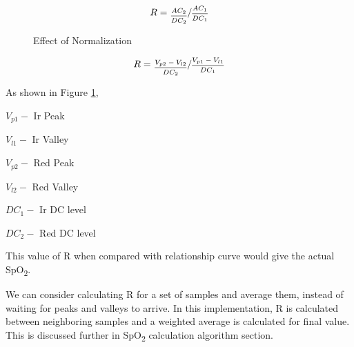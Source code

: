 	\[
		R = \sfrac{\frac{AC_2}{DC_2}}{{\frac{AC_1}{DC_1}}}
	\]	
	
	\begin{figure}[ht!]
		\centering
		\hfill
		\caption{Effect of Normalization}
		\label{fig:ppgnorm}
	\end{figure}

	\begin{equation}
	\label{eq:calc}	
	R = \sfrac{\frac{V_{p2} - V_{l2}}{DC_2}}{\frac{V_{p1} - V_{l1}}{DC_1}}
	\end{equation}	 

	As shown in Figure \ref{fig:ppgnorm},
	
	$V_{p1} - $  Ir Peak
	
	$V_{l1} - $  Ir Valley
	
	$V_{p2} - $  Red Peak
	
	$V_{l2} - $  Red Valley
	
	$DC_1 - $  Ir DC level
	
	$DC_2 - $  Red DC level


	This value of R when compared with relationship curve would give the actual SpO\textsubscript{2}.
	
	We can consider calculating R for a set of samples and average them, instead of
	waiting for peaks and valleys to arrive. In this implementation, R is calculated between neighboring samples and a weighted average{\cite{wuk}} is calculated for final value. This is discussed further in SpO\textsubscript{2} calculation algorithm section.